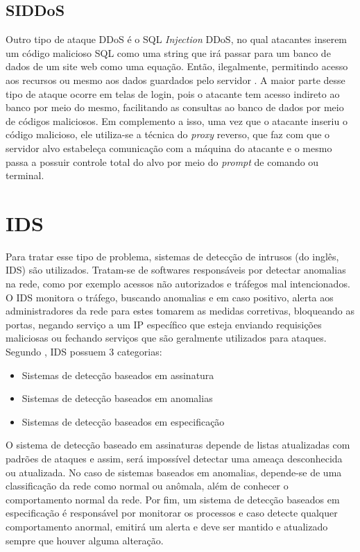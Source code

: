  \subsection{SIDDoS}   
  Outro tipo de ataque DDoS é o SQL \textit{Injection} DDoS, no qual atacantes inserem um código malicioso SQL como uma string que irá passar para um banco de dados de um site web como uma equação. Então, ilegalmente, permitindo acesso aos recursos ou mesmo aos dados guardados pelo servidor \cite{DataMining}. A maior parte desse tipo de ataque ocorre em telas de login, pois o atacante tem acesso indireto ao banco por meio do mesmo, facilitando as consultas ao banco de dados por meio de códigos maliciosos.   Em complemento a isso, uma vez que o atacante inseriu o código malicioso, ele utiliza-se a técnica do \textit{proxy} reverso, que faz com que o servidor alvo estabeleça comunicação com a máquina do atacante e o mesmo passa a possuir controle total do alvo por meio do \textit{prompt} de comando ou terminal.

\section{IDS}

Para tratar esse tipo de problema, sistemas de detecção de intrusos (do inglês, IDS) são utilizados. Tratam-se de softwares responsáveis  por detectar anomalias na rede, como por exemplo acessos não autorizados e tráfegos mal intencionados. O IDS monitora o tráfego, buscando anomalias e em caso positivo, alerta aos administradores da rede para estes tomarem as medidas corretivas, bloqueando as portas, negando serviço a um IP específico que esteja enviando requisições maliciosas ou fechando serviços que são geralmente utilizados para ataques. Segundo \cite{Ashoor2011}, IDS possuem 3 categorias: 
\begin{itemize}
	\item Sistemas de detecção baseados em assinatura
	\item Sistemas de detecção baseados em anomalias
	\item Sistemas de detecção baseados em especificação
\end{itemize}

O sistema de detecção baseado em assinaturas depende de listas atualizadas com padrões de ataques e assim, será impossível detectar uma ameaça desconhecida ou atualizada. No caso de sistemas baseados em anomalias, depende-se de uma classificação da rede como normal ou anômala, além de conhecer o comportamento normal da rede. Por fim, um sistema de detecção baseados em especificação é responsável por monitorar os processos e caso detecte qualquer comportamento anormal, emitirá um alerta e deve ser mantido e atualizado sempre que houver alguma alteração.

